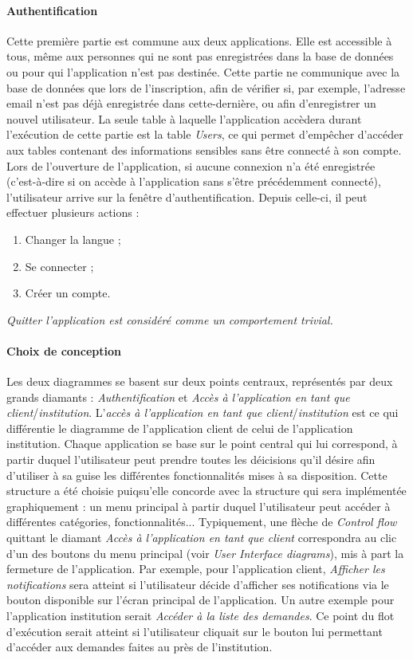 \paragraph{Authentification}
Cette première partie est commune aux deux applications. Elle est accessible à tous, même aux personnes qui ne sont pas enregistrées dans la base de données ou pour qui l'application n'est pas destinée. Cette partie ne communique avec la base de données que lors de l'inscription, afin de vérifier si, par exemple, l'adresse email n'est pas déjà enregistrée dans cette-dernière, ou afin d'enregistrer un nouvel utilisateur. La seule table à laquelle l'application accèdera durant l'exécution de cette partie est la table \emph{Users}, ce qui permet d'empêcher d'accéder aux tables contenant des informations sensibles sans être connecté à son compte.
\\
Lors de l'ouverture de l'application, si aucune connexion n'a été enregistrée (c'est-à-dire si on accède à l'application sans s'être précédemment connecté), l'utilisateur arrive sur la fenêtre d'authentification. Depuis celle-ci, il peut effectuer plusieurs actions :
\begin{enumerate}
\item Changer la langue ;
\item Se connecter ;
\item Créer un compte.
\end{enumerate}
\begin{footnotesize}
\textit{\emph{Quitter l'application} est considéré comme un comportement trivial.}
\end{footnotesize}


\paragraph{Choix de conception} Les deux diagrammes se basent sur deux points centraux, représentés par deux grands diamants : \emph{Authentification} et \emph{Accès à l'application en tant que client}/\emph{institution}. L'\emph{accès à l'application en tant que client}/\emph{institution} est ce qui différentie le diagramme de l'application client de celui de l'application institution. Chaque application se base sur le point central qui lui correspond, à partir duquel l'utilisateur peut prendre toutes les déicisions qu'il désire afin d'utiliser à sa guise les différentes fonctionnalités mises à sa disposition. Cette structure a été choisie puiqsu'elle concorde avec la structure qui sera implémentée graphiquement : un menu principal à partir duquel l'utilisateur peut accéder à différentes catégories, fonctionnalités... Typiquement, une flèche de \emph{Control flow} quittant le diamant \emph{Accès à l'application en tant que client} correspondra au clic d'un des boutons du menu principal (voir \emph{User Interface diagrams}), mis à part la fermeture de l'application. Par exemple, pour l'application client, \emph{Afficher les notifications} sera atteint si l'utilisateur décide d'afficher ses notifications via le bouton disponible sur l'écran principal de l'application. Un autre exemple pour l'application institution serait \emph{Accéder à la liste des demandes}. Ce point du flot d'exécution serait atteint si l'utilisateur cliquait sur le bouton lui permettant d'accéder aux demandes faites au près de l'institution.
